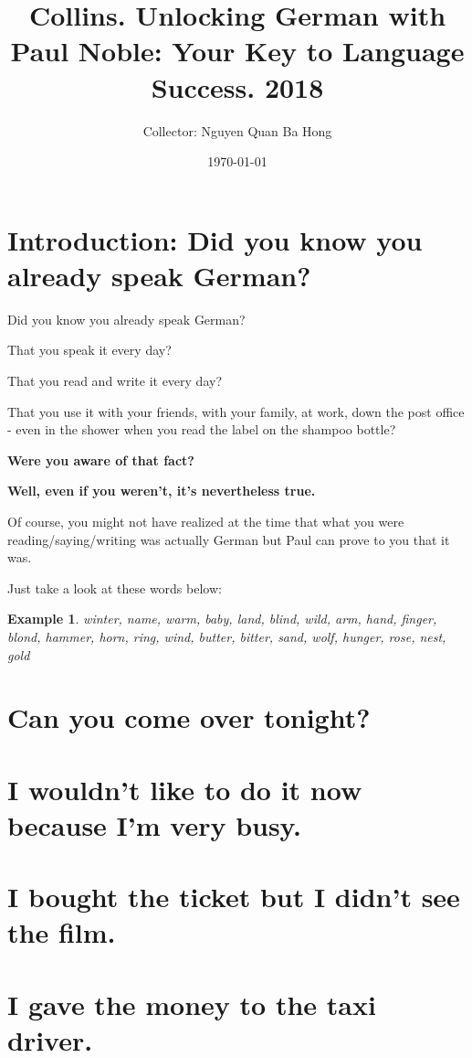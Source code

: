 \documentclass[oneside]{article}
\title{Collins. Unlocking German with Paul Noble: Your Key to Language Success. 2018}
\author{Collector: Nguyen Quan Ba Hong}
\date{\today}
\numberwithin{equation}{section}
\newtheorem{example}{Example}[section]
\begin{document}
\maketitle
\setcounter{secnumdepth}{6}
\setcounter{tocdepth}{6}
\tableofcontents


\section*{Introduction: Did you know you already speak German?}
Did you know you already speak German?

That you speak it every day?

That you read and write it every day?

That you use it with your friends, with your family, at work, down the post office - even in the shower when you read the label on the shampoo bottle?

%
\textbf{Were you aware of that fact?}

%
\textbf{Well, even if you weren't, it's nevertheless true.}

%
Of course, you might not have realized at the time that what you were reading/saying/writing was actually German but Paul can prove to you that it was.

Just take a look at these words below:
\begin{example}
    winter, name, warm, baby, land, blind, wild, arm, hand, finger, blond, hammer, horn, ring, wind, butter, bitter, sand, wolf, hunger, rose, nest, gold
\end{example}

\section{Can you come over tonight?}

\section{I wouldn't like to do it now because I'm very busy.}

\section{I bought the ticket but I didn't see the film.}

\section{I gave the money to the taxi driver.}
\end{document}

